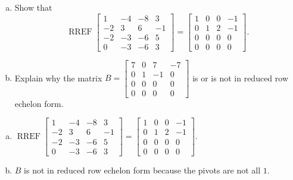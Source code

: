 
\begin{exerciseStatement}

\begin{enumerate}[(a)]
\item Show that \[\operatorname{RREF} \left[\begin{array}{cccc}
1 & -4 & -8 & 3 \\
-2 & 3 & 6 & -1 \\
-2 & -3 & -6 & 5 \\
0 & -3 & -6 & 3
\end{array}\right] = \left[\begin{array}{cccc}
1 & 0 & 0 & -1 \\
0 & 1 & 2 & -1 \\
0 & 0 & 0 & 0 \\
0 & 0 & 0 & 0
\end{array}\right] .\]
\item Explain why the matrix \(B= \left[\begin{array}{cccc}
7 & 0 & 7 & -7 \\
0 & 1 & -1 & 0 \\
0 & 0 & 0 & 0 \\
0 & 0 & 0 & 0
\end{array}\right] \) is or is not in reduced row echelon form.
\end{enumerate}
    
\end{exerciseStatement}
    
\begin{exerciseAnswer} 

\begin{enumerate}[(a)]
\item \(\operatorname{RREF} \left[\begin{array}{cccc}
1 & -4 & -8 & 3 \\
-2 & 3 & 6 & -1 \\
-2 & -3 & -6 & 5 \\
0 & -3 & -6 & 3
\end{array}\right] = \left[\begin{array}{cccc}
1 & 0 & 0 & -1 \\
0 & 1 & 2 & -1 \\
0 & 0 & 0 & 0 \\
0 & 0 & 0 & 0
\end{array}\right] .\)
\item \(B\) is not in reduced row echelon form because the pivots are not all \(1\). 
\end{enumerate}
    
\end{exerciseAnswer}
    
